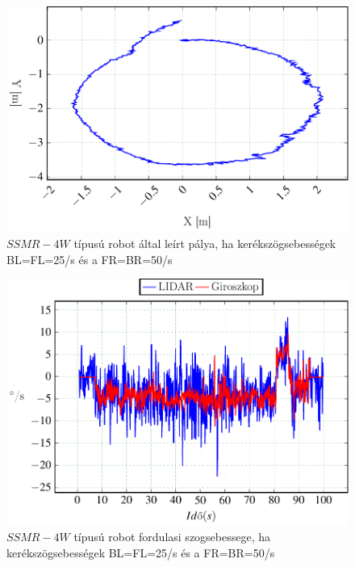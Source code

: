 \begin{figure}[H]
  \includegraphics{tikz/KorP0703b.pdf}
  \caption{$SSMR-4W$ típusú robot által leírt pálya, ha kerékszögsebességek BL=FL=25\degree/s és a FR=BR=50\degree/s}
  \label{fig:KorP0703b}
\end{figure}




\begin{figure}[H]
  \begin{center}
  	\includegraphics[scale=1]{tikz/KorP0703d.pdf}
  \end{center}
  \caption{$SSMR-4W$ típusú robot fordulasi szogsebessege, ha kerékszögsebességek BL=FL=25\degree/s és a FR=BR=50\degree/s}
  \label{fig:KorP0703d}
\end{figure}



